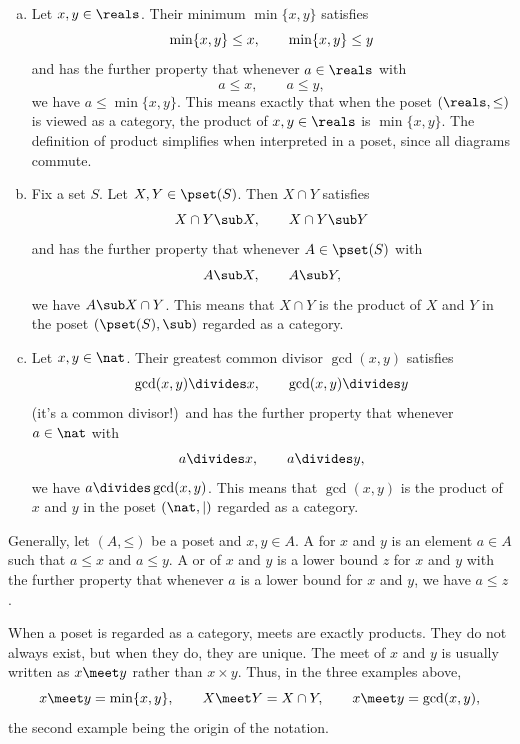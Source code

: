 \begin{examples}     
\label{eg:prod-order}
%
%
\begin{enumerate}[(b)]
\item 
Let $x, y \in \reals$.  Their minimum $\min\{x, y\}$ satisfies
\[
\min\{x, y\} \leq x,
\qquad
\min\{x, y\} \leq y
%
\index{minimum}
%
\]
and has the further property that whenever $a \in \reals$ with
\[
a \leq x,
\qquad 
a \leq y,
\]
we have $a \leq \min\{x, y\}$.  This means exactly that when the poset
$(\reals, \mathord{\leq})$ is viewed as a category, the product of $x, y
\in \reals$ is $\min\{x, y\}$.  The definition of product simplifies when
interpreted in a poset, since all diagrams commute.

\item 
Fix a set $S$.  Let $X, Y \in \pset(S)$.%
%
%
Then $X \cap Y$%
%
%
satisfies
\[
X \cap Y \sub X,
\qquad
X \cap Y \sub Y
\]
and has the further property that whenever $A \in \pset(S)$ with
\[
A \sub X,
\qquad
A \sub Y,
\]
we have $A \sub X \cap Y$.  This means that $X \cap Y$ is the product of
$X$ and $Y$ in the poset $(\pset(S), \mathord{\sub})$ regarded as a
category.

\item 
Let $x, y \in \nat$.  Their greatest%
%
%
common divisor $\gcd(x, y)$ satisfies
\[
\gcd(x, y) \divides x,
\qquad
\gcd(x, y) \divides y
\]
(it's a common divisor!)\ and has the further property that whenever $a \in
\nat$ with
\[
a \divides x,
\qquad
a \divides y,
\]
we have $a \divides \gcd(x, y)$.  This means that $\gcd(x, y)$ is the
product of $x$ and $y$ in the poset $(\nat, \mathord{\mid})$ regarded as a
category.
\end{enumerate}

Generally, let $(A, \mathord{\leq})$ be a poset and $x, y \in A$.  A
 for $x$ and $y$ is an element $a \in A$ such that $a
\leq x$ and $a \leq y$.  A  or %
%
%
of $x$ and $y$ is a lower bound $z$ for $x$ and $y$ with the further
property that whenever $a$ is a lower bound for $x$ and $y$, we have $a
\leq z$.

When a poset is regarded as a category, meets are exactly products.  They do
not always exist, but when they do, they are unique.  The meet of $x$ and $y$
is usually written as $x \meet y$%
%
%
rather than $x \times y$.  Thus, in the three examples above,
\[
x \meet y = \min\{x, y\},
\qquad
X \meet Y = X \cap Y,
\qquad
x \meet y = \gcd(x, y),
\]
the second example being the origin of the notation.%
%
%
\end{examples}

